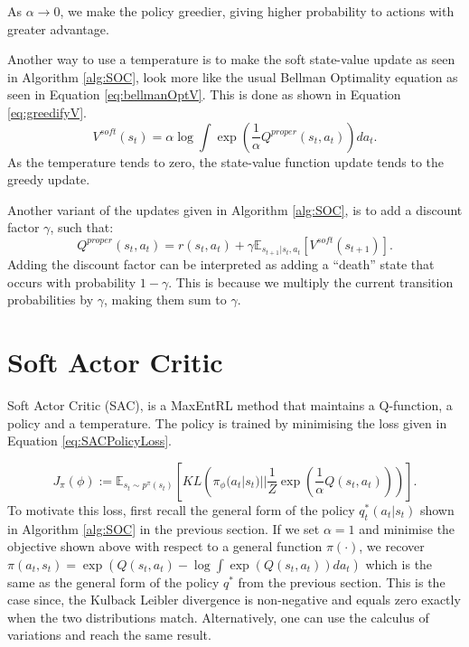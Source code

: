 \documentclass{report}
\numberwithin{equation}{section}
\numberwithin{figure}{section}
\numberwithin{table}{section}
\numberwithin{algorithm}{section}
\begin{document}
As $\alpha\rightarrow 0$, we make the policy greedier, giving 
higher probability to actions with greater advantage.

Another way to use a temperature is to make the soft state-value 
update as seen in Algorithm \ref{alg:SOC}, look more like the 
usual Bellman Optimality equation as seen in Equation \ref{eq:bellmanOptV}.
This is done as shown in Equation \ref{eq:greedifyV}.
\begin{equation}\label{eq:greedifyV}
  V^{soft}(s_t)=\alpha\log \int \exp(\frac{1}{\alpha}Q^{proper}(s_t,a_t))da_t.
\end{equation}
As the temperature tends to zero, the state-value function update 
tends to the greedy update.

Another variant of the updates given in Algorithm \ref{alg:SOC}, 
is to add a discount factor $\gamma$, such that:
\begin{equation*}
  Q^{proper}(s_t,a_t)=r(s_t,a_t) + \gamma \mathbb{E}_{s_{t+1}|s_t,a_t}[V^{soft}(s_{t+1})].
\end{equation*}
Adding the discount factor can be interpreted as adding a ``death'' 
state that occurs with probability $1-\gamma$. This is because 
we multiply the current transition probabilities by $\gamma$, making 
them sum to $\gamma$.

\section{Soft Actor Critic}
Soft Actor Critic (SAC), is a MaxEntRL method that maintains 
a Q-function, a policy and a temperature. The policy 
is trained by minimising the loss given in Equation \ref{eq:SACPolicyLoss}.

\begin{equation}\label{eq:SACPolicyLoss}
  J_\pi(\phi):=\mathbb{E}_{s_t\sim p^\pi(s_t)}\left[KL\left(\pi_\phi(a_t|s_t)||\frac{1}{Z}\exp\left(\frac{1}{\alpha}Q(s_t,a_t)\right)\right)\right].
\end{equation}
To motivate this loss, first recall the general form of the policy 
$q^*_t(a_t|s_t)$ shown in Algorithm \ref{alg:SOC} in the previous
section. If we set $\alpha=1$ and 
minimise the objective shown above with respect to a general function 
$\pi(\cdot)$, we recover $\pi(a_t,s_t)=\exp(Q(s_t,a_t) - \log \int \exp(Q(s_t,a_t))da_t)$ 
which is the same as the general form of the policy $q^*$ from 
the previous section. This is the case since, the Kulback Leibler 
divergence is non-negative and equals zero exactly when the 
two distributions match. Alternatively, one can use the 
calculus of variations and reach the same result. 
\end{document}
